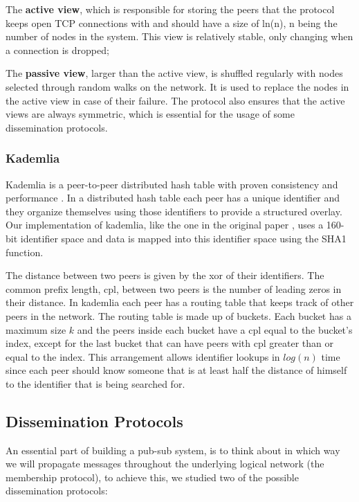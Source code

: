 \documentclass[sigconf]{acmart}
\begin{document}
The \textbf{active view}, which is responsible for storing the peers that the protocol keeps open TCP connections with and should have a size of ln(n), n being the number of nodes in the system. This view is relatively stable, only changing when a connection is dropped; 

The \textbf{passive view}, larger than the active view, is shuffled regularly with nodes selected through random walks on the network. It is used to replace the nodes in the active view in case of their failure. 
The protocol also ensures that the active views are always symmetric, which is essential for the usage of some dissemination protocols. 

\subsubsection{Kademlia}
Kademlia is a peer-to-peer distributed hash table with proven consistency and performance \cite{maymounkov2002kademlia}.
In a distributed hash table each peer has a unique identifier and they organize themselves using those identifiers to provide a structured overlay.
Our implementation of kademlia, like the one in the original paper \cite{maymounkov2002kademlia}, uses a 160-bit identifier space and data is mapped into this identifier space using the SHA1 function.

The distance between two peers is given by the xor of their identifiers.
The common prefix length, cpl, between two peers is the number of leading zeros in their distance.
In kademlia each peer has a routing table that keeps track of other peers in the network. The routing table is made up of buckets.
Each bucket has a maximum size $k$ and the peers inside each bucket have a cpl equal to the bucket's index, except for the last bucket that can have peers with cpl greater than or equal to the index.
This arrangement allows identifier lookups in $log(n)$ time since each peer should know someone that is at least half the distance of himself to the identifier that is being searched for.

\subsection{Dissemination Protocols}

An essential part of building a pub-sub system, is to think about in which way we will propagate messages throughout the underlying logical network (the membership protocol), to achieve this, we studied two of the possible dissemination protocols: 
\end{document}
